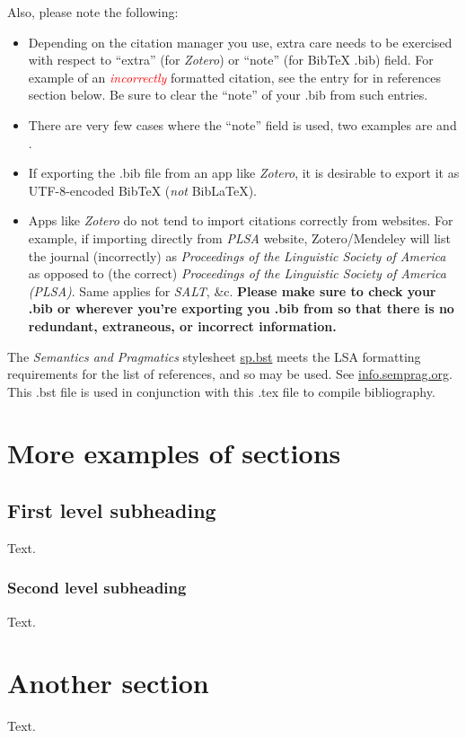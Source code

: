 Also, please note the following:
\begin{itemize}
    \item Depending on the citation manager you use, extra care needs to be exercised with respect to ``extra'' (for \textit{Zotero}) or ``note'' (for BibTeX .bib) field. For example of an \textcolor{red}{\textit{incorrectly}} formatted citation, see the entry for \cite{sankoff_formal_1981} in references section below. Be sure to clear the ``note'' of your .bib from such entries.
    \item There are very few cases where the ``note'' field is used, two examples are \cite{ozernyi_linguistic_2022} and \cite{ozernyi_rise_2022}. 
    \item If exporting the .bib file from an app like \textit{Zotero}, it is desirable to export it as UTF-8-encoded BibTeX (\textit{not} BibLaTeX).
    \item Apps like \textit{Zotero} do not tend to import citations correctly from websites. For example, if importing directly from \textit{PLSA} website, Zotero/Mendeley will list the journal (incorrectly) as \textit{Proceedings of the Linguistic Society of America} as opposed to (the correct) \textit{Proceedings of the Linguistic Society of America (PLSA)}. Same applies for \textit{SALT}, \&c. \textbf{Please make sure to check your .bib or wherever you're exporting you .bib from so that there is no redundant, extraneous, or incorrect information.} 
\end{itemize}

The \textit{Semantics and Pragmatics} stylesheet \href{https://raw.githubusercontent.com/semprag/tex/master/sp.bst}{sp.bst} meets the LSA formatting requirements for the list of references, and so may be used. See \href{http://info.semprag.org}{info.semprag.org}. This .bst file is used in conjunction with this .tex file to compile bibliography. 

\section{More examples of sections}
\subsection{First level subheading}
Text.
\subsubsection{Second level subheading} 
Text.
\section{Another section}
Text.
